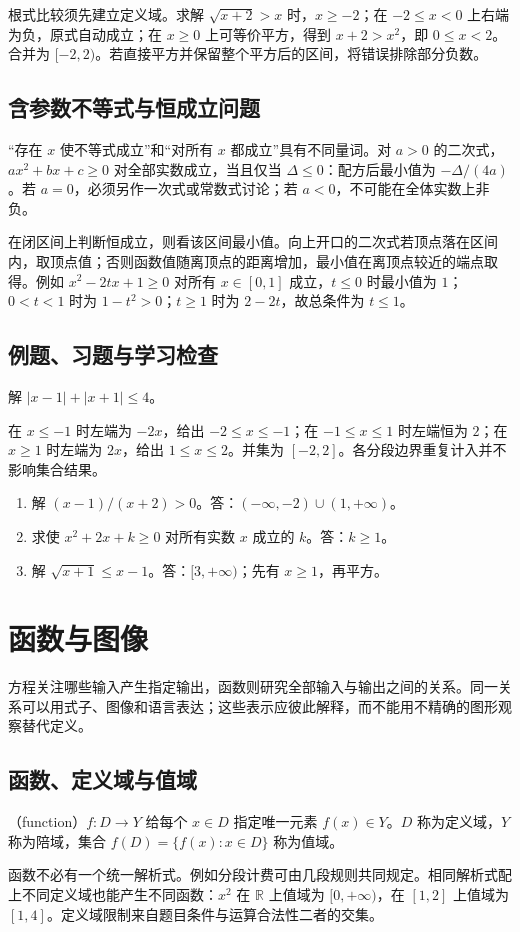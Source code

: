 \documentclass[UTF8]{ctexbook}
\begin{document}
根式比较须先建立定义域。求解 $\sqrt{x+2}>x$ 时，$x\ge-2$；在 $-2\le x<0$ 上右端为负，原式自动成立；在 $x\ge0$ 上可等价平方，得到 $x+2>x^2$，即 $0\le x<2$。合并为 $[-2,2)$。若直接平方并保留整个平方后的区间，将错误排除部分负数。

\section{含参数不等式与恒成立问题}
“存在 $x$ 使不等式成立”和“对所有 $x$ 都成立”具有不同量词。对 $a>0$ 的二次式，$ax^2+bx+c\ge0$ 对全部实数成立，当且仅当 $\Delta\le0$：配方后最小值为 $-\Delta/(4a)$。若 $a=0$，必须另作一次式或常数式讨论；若 $a<0$，不可能在全体实数上非负。

在闭区间上判断恒成立，则看该区间最小值。向上开口的二次式若顶点落在区间内，取顶点值；否则函数值随离顶点的距离增加，最小值在离顶点较近的端点取得。例如 $x^2-2tx+1\ge0$ 对所有 $x\in[0,1]$ 成立，$t\le0$ 时最小值为 $1$；$0<t<1$ 时为 $1-t^2>0$；$t\ge1$ 时为 $2-2t$，故总条件为 $t\le1$。

\section{例题、习题与学习检查}
\begin{example}
解 $|x-1|+|x+1|\le4$。
\end{example}
\begin{solve}
在 $x\le-1$ 时左端为 $-2x$，给出 $-2\le x\le-1$；在 $-1\le x\le1$ 时左端恒为 $2$；在 $x\ge1$ 时左端为 $2x$，给出 $1\le x\le2$。并集为 $[-2,2]$。各分段边界重复计入并不影响集合结果。
\end{solve}
\begin{enumerate}
\item 解 $(x-1)/(x+2)>0$。答：$(-\infty,-2)\cup(1,+\infty)$。
\item 求使 $x^2+2x+k\ge0$ 对所有实数 $x$ 成立的 $k$。答：$k\ge1$。
\item 解 $\sqrt{x+1}\le x-1$。答：$[3,+\infty)$；先有 $x\ge1$，再平方。
\end{enumerate}

\chapter{函数与图像}
\label{chap:em-functions}
方程关注哪些输入产生指定输出，函数则研究全部输入与输出之间的关系。同一关系可以用式子、图像和语言表达；这些表示应彼此解释，而不能用不精确的图形观察替代定义。

\section{函数、定义域与值域}
\begin{definition}
（function）$f:D\to Y$ 给每个 $x\in D$ 指定唯一元素 $f(x)\in Y$。$D$ 称为定义域，$Y$ 称为陪域，集合 $f(D)=\{f(x):x\in D\}$ 称为值域。
\end{definition}
函数不必有一个统一解析式。例如分段计费可由几段规则共同规定。相同解析式配上不同定义域也能产生不同函数：$x^2$ 在 $\mathbb R$ 上值域为 $[0,+\infty)$，在 $[1,2]$ 上值域为 $[1,4]$。定义域限制来自题目条件与运算合法性二者的交集。
\end{document}
